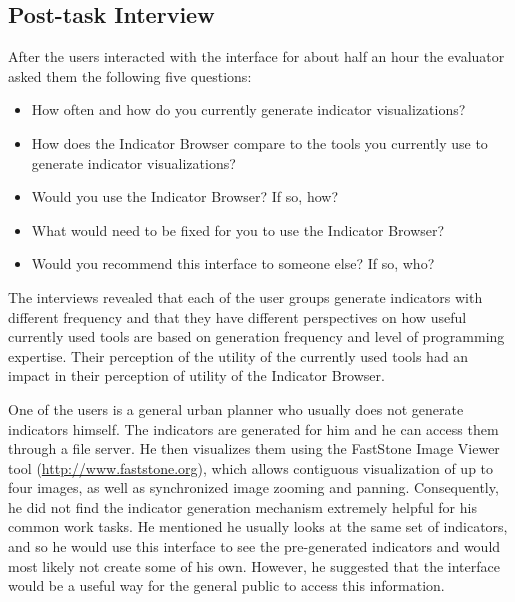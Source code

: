 \subsection{Post-task Interview}

After the users interacted with the interface for about half an hour the
evaluator asked them the following five questions:

\begin{itemize}
\item How often and how do you currently generate indicator visualizations?
\item How does the Indicator Browser compare to the tools you currently use
  to generate indicator visualizations?
\item Would you use the Indicator Browser? If so, how?
\item What would need to be fixed for you to use the Indicator Browser?
\item Would you recommend this interface to someone else? If so, who?
\end{itemize}

The interviews revealed that each of the user groups generate indicators
with different frequency and that they have different perspectives on how
useful currently used tools are based on generation frequency and level of
programming expertise.  Their perception of the utility of the currently
used tools had an impact in their perception of utility of the Indicator
Browser.

One of the users is a general urban planner who usually does not generate
indicators himself. The indicators are generated for him and he can access
them through a file server.  He then visualizes them using the
FastStone Image Viewer tool (\url{http://www.faststone.org}), which allows
contiguous visualization of up to four images, as well as synchronized
image zooming and panning. Consequently, he did not find the indicator
generation mechanism extremely helpful for his common work tasks. He
mentioned he usually looks at the same set of indicators, and so he would
use this interface to see the pre-generated indicators and would most
likely not create some of his own.  However, he suggested that the
interface would be a useful way for the general public to access this
information.

